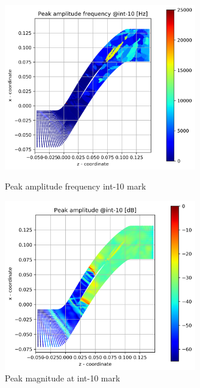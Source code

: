 \begin{figure}[ht]
  \centering
  \includegraphics[width=0.75\textwidth]{Figures/int-10-peak-freq.png}
  \caption{Peak amplitude frequency int-10 mark} \label{int-10-peak-freq}
  
  \vspace*{\floatsep}%

  \includegraphics[width=0.75\textwidth]{Figures/int-10-peak-mag.png}
  \caption{Peak magnitude at int-10 mark} \label{int-10-peak-mag}
\end{figure}

